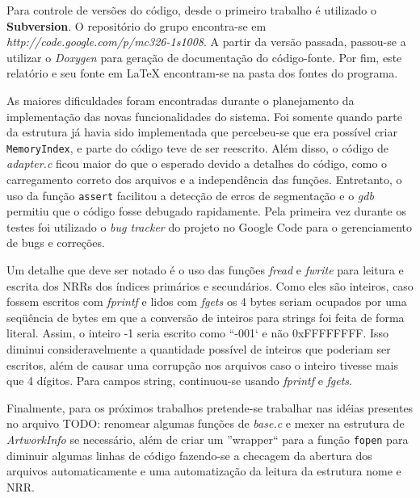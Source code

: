 \documentclass[a4paper,10pt]{article}
\begin{document}
Para controle de versões do código, desde o primeiro trabalho é utilizado o \textbf{Subversion}. O repositório do grupo encontra-se em \textit{http://code.google.com/p/mc326-1s1008}. A partir da versão passada, passou-se a utilizar o \textit{Doxygen} para geração de documentação do código-fonte. Por fim, este relatório e seu fonte em LaTeX encontram-se na pasta dos fontes do programa.

As maiores dificuldades foram encontradas durante o planejamento da implementação das novas funcionalidades do sistema. Foi somente quando parte da estrutura já havia sido implementada que percebeu-se que era possível criar \texttt{MemoryIndex}, e parte do código teve de ser reescrito. Além disso, o código de \textit{adapter.c} ficou maior do que o esperado devido a detalhes do código, como o carregamento correto dos arquivos e a independência das funções. Entretanto, o uso da função \texttt{assert} facilitou a detecção de erros de segmentação e o \textit{gdb} permitiu que o código fosse debugado rapidamente. Pela primeira vez durante os testes foi utilizado o \textit{bug tracker} do projeto no Google Code para o gerenciamento de bugs e correções.

Um detalhe que deve ser notado é o uso das funções \textit{fread} e \textit{fwrite} para leitura e escrita dos NRRs dos índices primários e secundários. Como eles são inteiros, caso fossem escritos com \textit{fprintf} e lidos com \textit{fgets} os 4 bytes seriam ocupados por uma seqüência de bytes em que a conversão de inteiros para strings foi feita de forma literal. Assim, o inteiro -1 seria escrito como ``-001` e não 0xFFFFFFFF. Isso diminui consideravelmente a quantidade possível de inteiros que poderiam ser escritos, além de causar uma corrupção nos arquivos caso o inteiro tivesse mais que 4 dígitos. Para campos string, continuou-se usando \textit{fprintf} e \textit{fgets}.

Finalmente, para os próximos trabalhos pretende-se trabalhar nas idéias presentes no arquivo TODO: renomear algumas funções de \textit{base.c} e mexer na estrutura de \textit{ArtworkInfo} se necessário, além de criar um ''wrapper`` para a função \texttt{fopen} para diminuir algumas linhas de código fazendo-se a checagem da abertura dos arquivos automaticamente e uma automatização da leitura da estrutura nome e NRR.
\end{document}

